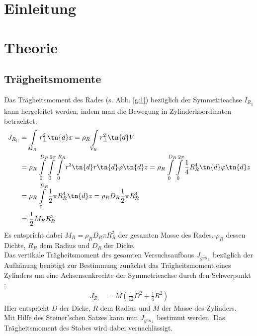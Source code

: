 \documentclass[12pt, a4paper, twoside]{scrartcl}
\begin{document}

\cleardoublepage
\tableofcontents
\cleardoublepage
\setcounter{page}{1}

\section{Einleitung}
\label{sec:einleitung}

\section{Theorie}
\label{sec:theorie}
\subsection{Trägheitsmomente}
Das Trägheitsmoment des Rades (s. Abb. \ref{g:1}) bezüglich der Symmetrieachse $I_{R_{||}}$ kann hergeleitet werden, indem man die Bewegung in Zylinderkoordinaten betrachtet:\\
\begin{align*}
 J_{R_{||}} &= \int \limits_{M_R} r^2_{\perp} \tn{d}x = \rho_R \int \limits_{V_R} r^2_{\perp} \tn{d} V \\
 &=\rho_R \int \limits_0^{D_R} \int \limits_0^{2\pi} \int \limits_0^{R_R} r^3 \tn{d}r \tn{ d}\varphi \tn{ d}z = \rho_R \int \limits_0^{D_R} \int \limits_0^{2\pi} \frac{1}{4} R^4_R \tn{ d}\varphi \tn{ d}z  \\
 &= \rho_R \int \limits_0^{D_R} \frac{1}{2}\pi R^4_R \tn{d}z = \rho_R D_R \frac{1}{2} \pi R^4_R \\
 &= \frac{1}{2} M_R R^2_R 
\end{align*}
Es entspricht dabei $M_R = \rho_R D_R \pi R^2_R$ der gesamten Masse des Rades, $\rho_R$ dessen Dichte, $R_R$ dem Radius und $D_R$ der Dicke.\\
\newline
Das vertikale Trägheitsmoment des gesamten Versuchsaufbaus $J_{ges_\perp}$ bezüglich der Aufhänung benötigt zur Bestimmung zunächst das Trägheitsmoment eines Zylinders um eine Achsensenkrechte der Symmetrieachse durch den Schwerpunkt \protect\footnotemark:\\
\begin{align*}
 J_{Z_{\perp}} &= M \left( \frac{1}{12} D^2 + \frac{1}{4} R^2 \right)
\end{align*}
Hier entspricht $D$ der Dicke, $R$ dem Radius und $M$ der Masse des Zylinders.\\
Mit Hilfe des Steiner'schen Satzes kann nun $J_{ges_\perp}$ bestimmt werden. Das Trägheitsmoment des Stabes wird dabei vernachlässigt.\\
\end{document}

